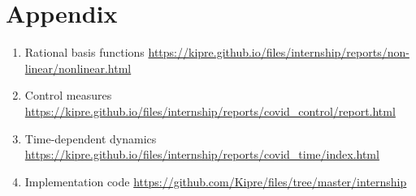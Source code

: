 \documentclass[12pt, letterpaper]{article}
\begin{document}
 


\section*{Appendix}
\label{sec:appendix}

\begin{enumerate}
	\item Rational basis functions \url{https://kipre.github.io/files/internship/reports/non-linear/nonlinear.html} \label{app:rational}
	\item Control measures \url{https://kipre.github.io/files/internship/reports/covid_control/report.html} \label{app:control}
	\item Time-dependent dynamics \url{https://kipre.github.io/files/internship/reports/covid_time/index.html} \label{app:time-dependent}
	\item Implementation code \url{https://github.com/Kipre/files/tree/master/internship} \label{app:code}
\end{enumerate}
\end{document}

